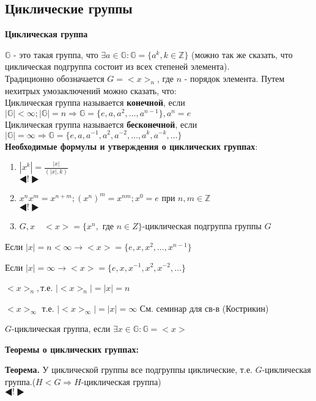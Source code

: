 \documentclass[12pt]{article}
\begin{document}
		\subsection{Циклические группы}
				\hypertarget{indef:circle_group}{\textbf{Циклическая группа}} $\mathds{G}$ - это такая группа, что $ \exists a \in \mathds{G} : \mathds{G}=\{a^k, k \in \mathds{Z} \}$ (можно так же сказать, что циклическая подгруппа состоит из всех степеней элемента).\\
				 Традиционно обозначается $G = <x>_n$, где $n$ - порядок элемента. Путем нехитрых умозаключений можно сказать, что: \\
				Циклическая группа называется \hypertarget{indef:inf_circle_group}{\textbf{конечной}}, если $|\mathds{G}|<\infty; |\mathds{G}|=n \Rightarrow \mathds{G}=\{e,a,a^2, \dots , a^{n-1} \}, a^n=e$\\
				Циклическая группа называется \hypertarget{indef:noninf_circle_gtoup}{\textbf{бесконечной}}, если $|\mathds{G}|= \infty \Rightarrow \mathds{G}=\{ e,a,a^{-1},a^2,a^{-2}, \dots, a^k, a^{-k}, \dots \}$\\
				\hypertarget{f:circle}{\textbf{Необходимые формулы и утверждения о циклических группах}}:
				\begin{enumerate}
					\item $|x^k|=\frac{|x|}{(|x|,k)}$ \\
						$\LHD ! \RHD$
					\item $x^n x^m=x^{n+m}; (x^n)^m=x^{nm}; x^0=e$ при $n,m \in \mathds{Z}$ \\
						$\LHD ! \RHD$
					\item$G,x \quad <x>=\{x^n,\text{ где } n\in Z\}$-циклическая подгруппа группы $G$
					
				\end{enumerate} 
					
					Если $|x|=n<\infty \rightarrow <x>= \{e,x,x^2, \dots, x^{n-1} \}$
					
					Если $|x|=\infty \rightarrow <x>=\{e,x,x^{-1},x^2, x^{-2}, \dots \}$ 
					
					$<x>_n, $т.е. $|<x>_n|=|x|=n$
					
					$<x>_\infty$ т.е. $|<x>_\infty|=|x|=\infty$ См. семинар для св-в (Кострикин)
					
					$G$-циклическая группа, если $\exists x\in \mathds{G}:\mathds{G}=<x>$
					

					\hypertarget{th}{\textbf{Теоремы о циклических группах:}}
					
					\textbf{Теорема.} У циклической группы все подгруппы циклические, т.е. $G$-циклическая группа.($H<G \Rightarrow H$-циклическая группа) \\
						$\LHD ! \RHD$
					
\end{document}
